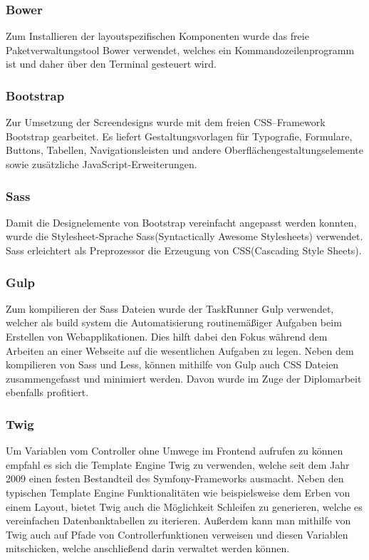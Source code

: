    \subsubsection{Bower}

	Zum Installieren der layoutspezifischen Komponenten wurde das freie Paketverwaltungstool Bower verwendet, welches ein Kommandozeilenprogramm ist und daher über den Terminal gesteuert wird.

    \subsubsection{Bootstrap}

	Zur Umsetzung der Screendesigns wurde mit dem freien CSS–Framework Bootstrap gearbeitet. Es liefert Gestaltungsvorlagen für Typografie, Formulare, Buttons, Tabellen, Navigationsleisten und andere Oberflächengestaltungselemente sowie zusätzliche JavaScript-Erweiterungen.

    \subsubsection{Sass}

	Damit die Designelemente von Bootstrap vereinfacht angepasst werden konnten, wurde die Stylesheet-Sprache Sass(Syntactically Awesome Stylesheets) verwendet. Sass erleichtert als Preprozessor die Erzeugung von CSS(Cascading Style Sheets).

    \subsubsection{Gulp}

	Zum kompilieren der Sass Dateien wurde der TaskRunner Gulp verwendet, welcher als build system die Automatisierung routinemäßiger Aufgaben beim Erstellen von Webapplikationen. Dies hilft dabei den Fokus während dem Arbeiten an einer Webseite auf die wesentlichen Aufgaben zu legen. Neben dem kompilieren von Sass und Less, können mithilfe von Gulp auch CSS Dateien zusammengefasst und minimiert werden. Davon wurde im Zuge der Diplomarbeit ebenfalls profitiert.

    \subsubsection{Twig}

	Um Variablen vom Controller ohne Umwege im Frontend aufrufen zu können empfahl es sich die Template Engine Twig zu verwenden, welche seit dem Jahr 2009 einen festen Bestandteil des Symfony-Frameworks ausmacht. Neben den typischen Template Engine Funktionalitäten wie beispielsweise dem Erben von einem Layout, bietet Twig auch die Möglichkeit Schleifen zu generieren, welche es vereinfachen Datenbanktabellen zu iterieren. Außerdem kann man mithilfe von Twig auch auf Pfade von Controllerfunktionen verweisen und diesen Variablen mitschicken, welche anschließend darin verwaltet werden können.

